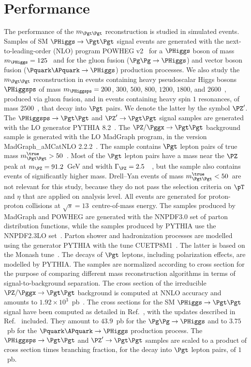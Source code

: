 \section{Performance}
\label{sec:performance}

The performance of the $m_{\Pgt\Pgt}$ reconstruction is studied in simulated events.
Samples of SM $\PHiggs \to \Pgt\Pgt$ signal events
are generated with the next-to-leading-order (NLO) program POWHEG v2~\cite{POWHEG1,POWHEG2,POWHEG3}
for a $\PHiggs$ boson of mass $m_{\PHiggs} = 125$~\GeV 
and for the gluon fusion ($\Pg\Pg \to \PHiggs$) and vector boson fusion ($\Pquark\APquark \to \PHiggs$) production processes.
We also study the $m_{\Pgt\Pgt}$ reconstruction in events containing
heavy pseudoscalar Higgs bosons $\PHiggsps$ of mass $m_{\PHiggsps} = 200$, $300$, $500$, $800$, $1200$, $1800$, and $2600$~\GeV,
produced via gluon fusion, and in events containing heavy spin $1$
resonances, of mass $2500$~\GeV, that decay into $\Pgt$ pairs.
We denote the latter by the symbol $\PZ'$. 
The $\PHiggsps \to \Pgt\Pgt$ and $\PZ' \to \Pgt\Pgt$ signal samples are generated with the LO generator PYTHIA 8.2~\cite{pythia8}.
The $\PZ/\Pggx \to \Pgt\Pgt$ background sample is generated with the LO MadGraph program, in the version MadGraph\_aMCatNLO 2.2.2~\cite{MadGraph_aMCatNLO}.
The sample contains $\Pgt$ lepton pairs of true mass $m_{\Pgt\Pgt}^{\true} > 50$~\GeV.
Most of the $\Pgt$ lepton pairs have a mass near the $\PZ$ peak at $m_{\PZ} = 91.2$~GeV and width $\Gamma_{\PZ} = 2.5$~\GeV~\cite{PDG}, 
but the sample also contains events of significantly higher mass.
Drell--Yan events of mass $m_{\Pgt\Pgt}^{\true} < 50$~\GeV are not relevant for this study, 
because they do not pass the selection criteria on $\pT$ and $\eta$ that are applied on analysis level.
All events are generated for proton-proton collisions at $\sqrt{s} = 13$~\TeV centre-of-mass energy.
The samples produced by MadGraph and POWHEG are generated with the NNPDF3.0 set of parton distribution functions,
while the samples produced by PYTHIA use the NNPDF2.3LO set~\cite{NNPDF1,NNPDF2,NNPDF3}.
Parton shower and hadronization processes are modelled using the generator PYTHIA with the tune CUETP8M1~\cite{PYTHIA_CUETP8M1tune_CMS}.
The latter is based on the Monash tune~\cite{PYTHIA_MonashTune}.
The decays of $\Pgt$ leptons, including polarization effects, are modelled by PYTHIA.
The samples are normalized according to cross section for the purpose of comparing different mass reconstruction algorithms in terms of signal-to-background separation.
The cross section of the irreducible $\PZ/\Pggx \to \Pgt\Pgt$ background is computed at NNLO accuracy and amounts to $1.92 \times 10^{3}$~pb~\cite{FEWZ}.
The cross sections for the SM $\PHiggs \to \Pgt\Pgt$ signal have been computed as detailed in Ref.~\cite{Dittmaier:2011ti},
with the updates described in Ref.~\cite{Heinemeyer:2013tqa} included.
They amount to $43.9$~pb for the $\Pg\Pg \to \PHiggs$ and to $3.75$~pb for the $\Pquark\APquark \to \PHiggs$ production process.
The $\PHiggsps \to \Pgt\Pgt$ and $\PZ' \to \Pgt\Pgt$ samples 
are scaled to a product of cross section times branching fraction, for the decay into $\Pgt$ lepton pairs, of $1$~pb.


